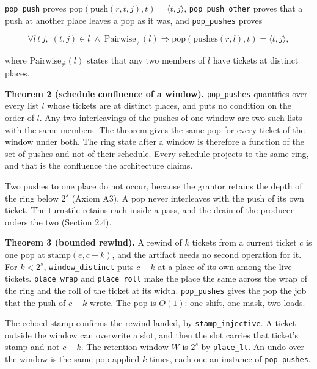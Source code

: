 \texttt{pop\_\allowbreak{}push} proves \(\mathrm{pop}(\mathrm{push}(r, t, j), t) = \langle t, j \rangle\), \texttt{pop\_\allowbreak{}push\_\allowbreak{}other} proves that a push at another place leaves a pop as it was, and \texttt{pop\_\allowbreak{}pushes} proves

\[
\forall l\, t\, j,\; (t, j) \in l \;\land\; \mathrm{Pairwise}_{\neq}(l) \Rightarrow \mathrm{pop}(\mathrm{pushes}(r, l), t) = \langle t, j \rangle,
\]

where \(\mathrm{Pairwise}_{\neq}(l)\) states that any two members of \(l\) have tickets at distinct places.

\textbf{Theorem 2 (schedule confluence of a window).} \texttt{pop\_\allowbreak{}pushes} quantifies over every list \(l\) whose tickets are at distinct places, and puts no condition on the order of \(l\). Any two interleavings of the pushes of one window are two such lists with the same members. The theorem gives the same pop for every ticket of the window under both. The ring state after a window is therefore a function of the set of pushes and not of their schedule. Every schedule projects to the same ring, and that is the confluence the architecture claims.

Two pushes to one place do not occur, because the grantor retains the depth of the ring below \(2^{s}\) (Axiom A3). A pop never interleaves with the push of its own ticket. The turnstile retains each inside a pass, and the drain of the producer orders the two (Section 2.4).

\textbf{Theorem 3 (bounded rewind).} A rewind of \(k\) tickets from a current ticket \(c\) is one pop at \(\mathrm{stamp}(e, c - k)\), and the artifact needs no second operation for it. For \(k < 2^{s}\), \texttt{window\_\allowbreak{}distinct} puts \(c - k\) at a place of its own among the live tickets. \texttt{place\_\allowbreak{}wrap} and \texttt{place\_\allowbreak{}roll} make the place the same across the wrap of the ring and the roll of the ticket at its width. \texttt{pop\_\allowbreak{}pushes} gives the pop the job that the push of \(c - k\) wrote. The pop is \(O(1)\): one shift, one mask, two loads.

The echoed stamp confirms the rewind landed, by \texttt{stamp\_\allowbreak{}injective}. A ticket outside the window can overwrite a slot, and then the slot carries that ticket's stamp and not \(c - k\). The retention window \(W\) is \(2^{s}\) by \texttt{place\_\allowbreak{}lt}. An undo over the window is the same pop applied \(k\) times, each one an instance of \texttt{pop\_\allowbreak{}pushes}.

